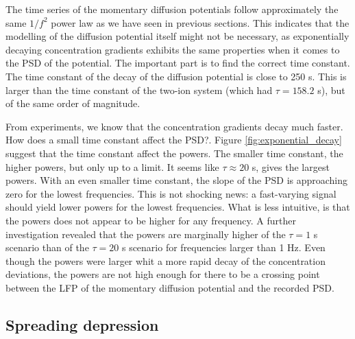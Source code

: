 \documentclass{article}
\begin{document}
The time series of the momentary diffusion potentials follow approximately the same $1/f^2$ power law as we have seen in previous sections. This indicates that the modelling of the diffusion potential itself might not be necessary, as exponentially decaying concentration gradients exhibits the same properties when it comes to the PSD of the potential. The important part is to find the correct time constant. The time constant of the decay of the diffusion potential is close to 250 s. This is larger than the time constant of the two-ion system (which had $\tau = 158.2$ s), but of the same order of magnitude.

From experiments, we know that the concentration gradients decay much faster. How does a small time constant affect the PSD?. Figure \ref{fig:exponential_decay} suggest that the time constant affect the powers. The smaller time constant, the higher powers, but only up to a limit. It seems like $\tau \approx 20 $ s, gives the largest powers. With an even smaller time constant, the slope of the PSD is approaching zero for the lowest frequencies. This is not shocking news: a fast-varying signal should yield lower powers for the lowest frequencies. What is less intuitive, is that the powers does not appear to be higher for any frequency. A further investigation revealed that the powers are marginally higher of the $\tau = 1$ s scenario than of the $\tau = 20 $ s scenario for frequencies larger than 1 Hz.
Even though the powers were larger whit a more rapid decay of the concentration deviations, the powers are not high enough for there to be a crossing point between the LFP of the momentary diffusion potential and the recorded PSD. 

\subsection{Spreading depression}\label{SD simulated}
\end{document}
